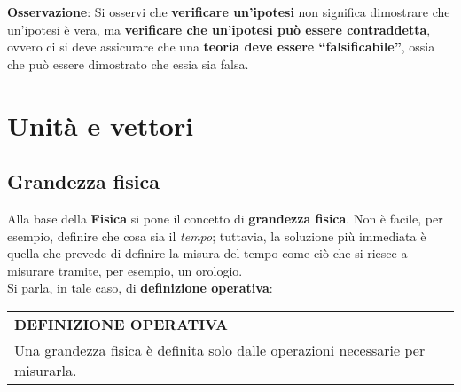 \documentclass[a4paper]{extarticle}
\newcommand{\quotes}[1]{``#1''}
\renewcommand\arraystretch{}
\begin{document}
\vspace{1em}
\noindent
\textbf{Osservazione}: Si osservi che \textbf{verificare un'ipotesi} non significa dimostrare che un'ipotesi è vera, ma \textbf{verificare che un'ipotesi può essere contraddetta}, ovvero ci si deve assicurare che una \textbf{teoria deve essere \quotes{falsificabile}}, ossia che può essere dimostrato che essia sia falsa.

\newpage
\section{Unità e vettori}

\vspace{1em}
\subsection{Grandezza fisica}
Alla base della \textbf{Fisica} si pone il concetto di \textbf{grandezza fisica}. Non è facile, per esempio, definire che cosa sia il \emph{tempo}; tuttavia, la soluzione più immediata è quella che prevede di definire la misura del tempo come ciò che si riesce a misurare tramite, per esempio, un orologio.\\
Si parla, in tale caso, di \textbf{definizione operativa}:

\vspace{1em}
\setlength{\tabcolsep}{14pt}
\renewcommand{\arraystretch}{2}
\noindent
\begin{tabularx}{\textwidth}{@{}|P|@{}}
    \hline
    {\textbf{DEFINIZIONE OPERATIVA}}\\
    \parbox{\linewidth}{Una grandezza fisica è definita solo dalle operazioni necessarie per misurarla.
    \vspace{3mm}}\\
    \hline
\end{tabularx}
\end{document}
